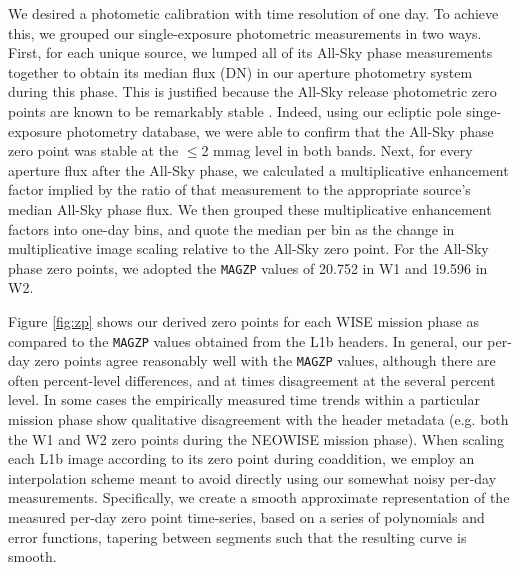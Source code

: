 \documentclass{emulateapj}
\begin{document}
\begin{figure*} [ht]
 \begin{center}
  \caption{\label{fig:zp} In each panel, the red dashes give the per-day
           photometric zero points we derived based on repeat measurements
           of stars near the ecliptic poles, as described in 
           $\S$\ref{sec:calib}. The black lines show the
           \texttt{MAGZP} zero point values provided by the L1b header 
           metadata. The magenta (green) dashes
           represent the zero point time trends which would have resulted had
           we restricted our analysis to aperture photometry of only the north 
           (south) ecliptic pole.}
 \end{center}
\end{figure*}

We desired a photometic calibration with time resolution of one day. To
achieve this, we grouped our single-exposure photometric measurements in two 
ways. First, for each 
unique source, we lumped all of its All-Sky phase measurements together to 
obtain its median flux (DN) in our aperture photometry system during this 
phase. This is justified because the All-Sky release photometric zero points 
are known to be remarkably stable \citep{jarrett11}. Indeed, using our ecliptic
pole singe-exposure photometry database, we were able to confirm that the 
All-Sky phase zero point was stable at the $\le$2 mmag level in both bands. 
Next, for every aperture flux after the All-Sky phase, we calculated a 
multiplicative enhancement factor
implied by the ratio of that measurement to the appropriate source's
median All-Sky phase flux. We then grouped these 
multiplicative enhancement factors into one-day bins, and quote the median per 
bin as the change in multiplicative
image scaling relative to the All-Sky zero point. For the  
All-Sky phase zero points, we adopted the \verb|MAGZP| values of 20.752 in W1 
and 19.596 in W2.

Figure \ref{fig:zp} shows our derived zero points for each WISE mission phase 
as compared to the \verb|MAGZP| values obtained from the L1b headers.  
In general, our per-day zero points agree reasonably
well with the \verb|MAGZP| values, although there are often 
percent-level differences, and at times disagreement at the several percent
level. In some cases the empirically measured time trends within a particular 
mission phase show qualitative disagreement with the header metadata (e.g. both
the W1 and W2 zero points during the NEOWISE mission phase). When scaling each
L1b image according to its zero point during coaddition, we employ an 
interpolation scheme meant to avoid directly using our somewhat noisy per-day 
measurements. Specifically, we create a smooth approximate representation of 
the measured per-day zero point time-series, based on a series of polynomials 
and error functions, tapering between segments such that the resulting curve is
 smooth.
\end{document}
